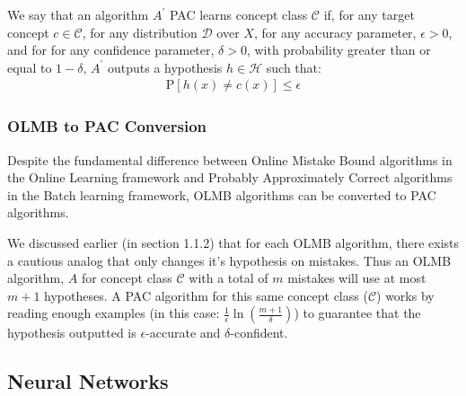 																																																								    \noindent We say that an algorithm $A^{'}$ PAC learns concept class $\mathcal{C}$ if, for any target concept $c \in \mathcal{C}$, for any distribution $\mathcal{D}$ over $X$, for any accuracy parameter, $\epsilon > 0$, and for for any confidence parameter, $\delta > 0$, with probability greater than or equal to $ 1-\delta$, $A^{'}$ outputs a hypothesis $h \in \mathcal{H}$ such that: 
																																																									    \begin{align*}
																																																										        \mathrm{P}[h(x) \neq c(x)] \leq \epsilon
																																																												    \end{align*}
																																																													    
																																																														    \subsubsection{OLMB to PAC Conversion}
																																																															    Despite the fundamental difference between Online Mistake Bound algorithms in the Online Learning framework and Probably Approximately Correct algorithms in the Batch learning framework, OLMB algorithms can be converted to PAC algorithms. \vspace{4mm}
																																																																    
																																																																	    \noindent We discussed earlier (in section 1.1.2) that for each OLMB algorithm, there exists a cautious analog that only changes it's hypothesis on mistakes. Thus an OLMB algorithm, $A$ for concept class $\mathcal{C}$ with a total of $m$ mistakes will use at most $m+1$ hypotheses. A PAC algorithm for this same concept class ($\mathcal{C}$) works by reading enough examples (in this case: $\frac{1}{\epsilon}\ln(\frac{m+1}{\delta})$) to guarantee that the hypothesis outputted is $\epsilon$-accurate and $\delta$-confident.

																																																																		    \subsection{Neural Networks}  
																																																																			        
